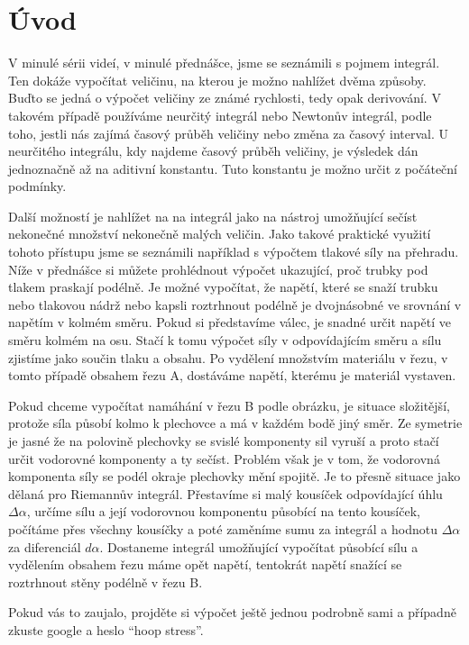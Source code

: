 \documentclass[12pt]{article}
\begin{document}
\section*{Úvod}

V minulé sérii videí, v minulé přednášce, jsme se seznámili s pojmem integrál. Ten dokáže vypočítat veličinu, na kterou je možno nahlížet dvěma způsoby. Buďto se jedná o výpočet veličiny ze známé rychlosti, tedy opak derivování. V takovém případě používáme neurčitý integrál nebo Newtonův integrál, podle toho, jestli nás zajímá časový průběh veličiny nebo změna za časový interval. U neurčitého integrálu, kdy najdeme časový průběh veličiny, je výsledek dán jednoznačně až na aditivní konstantu. Tuto konstantu je možno určit z počáteční podmínky.

Další možností je nahlížet na na integrál jako na nástroj umožňující sečíst nekonečné množství nekonečně malých veličin. Jako takové praktické využití tohoto přístupu jsme se seznámili například s výpočtem tlakové síly na přehradu. Níže v přednášce si můžete prohlédnout výpočet ukazující, proč trubky pod tlakem praskají podélně. Je možné vypočítat, že napětí, které se snaží trubku nebo tlakovou nádrž nebo kapsli roztrhnout podélně je dvojnásobné ve srovnání v napětím v kolmém směru. Pokud si představíme válec, je snadné určit napětí ve směru kolmém na osu. Stačí k tomu výpočet síly v odpovídajícím směru a sílu zjistíme jako součin tlaku a obsahu. Po vydělení množstvím materiálu v řezu, v tomto případě obsahem řezu A, dostáváme napětí, kterému je materiál vystaven.

Pokud chceme vypočítat namáhání v řezu B podle obrázku, je situace složitější, protože síla působí kolmo k plechovce a má v každém bodě jiný směr. Ze symetrie je jasné že na polovině plechovky se svislé komponenty sil vyruší a proto stačí určit vodorovné komponenty a ty sečíst. Problém však je v tom, že vodorovná komponenta síly se podél okraje plechovky mění spojitě. Je to přesně situace jako dělaná pro Riemannův integrál. Přestavíme si malý kousíček odpovídající úhlu $\Delta \alpha$, určíme sílu a její vodorovnou komponentu působící na tento kousíček, počítáme přes všechny kousíčky a poté zaměníme sumu za integrál a hodnotu $\Delta \alpha$ za diferenciál $d\alpha$. Dostaneme integrál umožňující vypočítat působící sílu a vydělením obsahem řezu máme opět napětí, tentokrát napětí snažící se roztrhnout stěny podélně v řezu B.

Pokud vás to zaujalo, projděte si výpočet ještě jednou podrobně sami a případně zkuste google a heslo ``hoop stress''.
\end{document}
